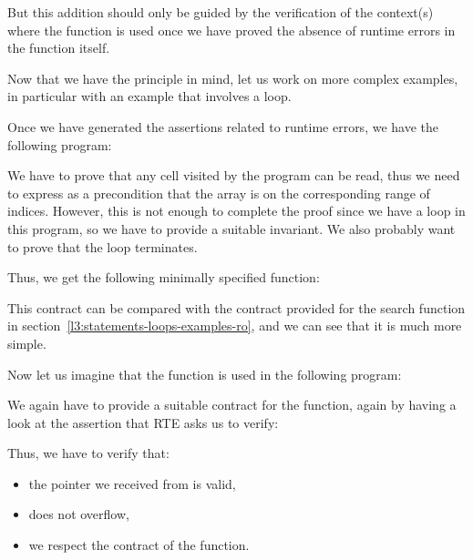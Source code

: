 

But this addition should only be guided by the verification of the context(s)
where the function is used once we have proved the absence of runtime errors in
the function itself.





Now that we have the principle in mind, let us work on more complex examples, in
particular with an example that involves a loop.




Once we have generated the assertions related to runtime errors, we have the
following program:




We have to prove that any cell visited by the program can be read, thus we need
to express as a precondition that the array is
 on the corresponding range of indices.
However, this is not enough to complete the proof since we have a loop in this
program, so we have to provide a suitable invariant. We also probably want to
prove that the loop terminates.


Thus, we get the following minimally specified function:




This contract can be compared with the contract provided for the search
function in section~\ref{l3:statements-loops-examples-ro}, and we can see that it is
much more simple.


Now let us imagine that the function is used in the following program:




We again have to provide a suitable contract for the function, again by having
a look at the assertion that RTE asks us to verify:




Thus, we have to verify that:
\begin{itemize}
\item the pointer we received from  is valid,
\item {} does not overflow,
\item we respect the contract of the  function.
\end{itemize}


